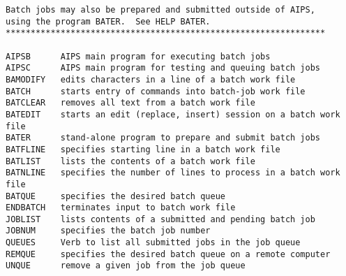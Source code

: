 \begin{verbatim}
Batch jobs may also be prepared and submitted outside of AIPS,
using the program BATER.  See HELP BATER.
****************************************************************

AIPSB      AIPS main program for executing batch jobs
AIPSC      AIPS main program for testing and queuing batch jobs
BAMODIFY   edits characters in a line of a batch work file
BATCH      starts entry of commands into batch-job work file
BATCLEAR   removes all text from a batch work file
BATEDIT    starts an edit (replace, insert) session on a batch work file
BATER      stand-alone program to prepare and submit batch jobs
BATFLINE   specifies starting line in a batch work file
BATLIST    lists the contents of a batch work file
BATNLINE   specifies the number of lines to process in a batch work file
BATQUE     specifies the desired batch queue
ENDBATCH   terminates input to batch work file
JOBLIST    lists contents of a submitted and pending batch job
JOBNUM     specifies the batch job number
QUEUES     Verb to list all submitted jobs in the job queue
REMQUE     specifies the desired batch queue on a remote computer
UNQUE      remove a given job from the job queue
\end{verbatim}\eve


